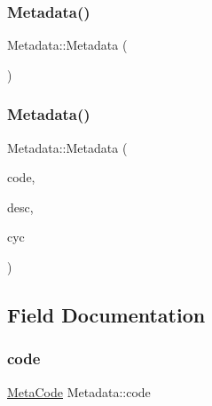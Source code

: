 \subsubsection{\texorpdfstring{Metadata()}{Metadata()}\hspace{0.1cm}{\footnotesize\ttfamily [1/2]}}
{\footnotesize\ttfamily Metadata\+::\+Metadata (\begin{DoxyParamCaption}{ }\end{DoxyParamCaption})\hspace{0.3cm}{\ttfamily [inline]}}

\hypertarget{struct_metadata_a5ff361e275630c284655d0e4d7e9667e}{}\label{struct_metadata_a5ff361e275630c284655d0e4d7e9667e} 
\subsubsection{\texorpdfstring{Metadata()}{Metadata()}\hspace{0.1cm}{\footnotesize\ttfamily [2/2]}}
{\footnotesize\ttfamily Metadata\+::\+Metadata (\begin{DoxyParamCaption}\item[{\hyperlink{_sim_data_structs_8h_af2e7854cb25f6e7ebcac71cd2dd88516}{Meta\+Code}}]{code,  }\item[{\hyperlink{_sim_data_structs_8h_abb2b49b699fce2da44bb66f1b315b6d6}{Meta\+Desc}}]{desc,  }\item[{int}]{cyc }\end{DoxyParamCaption})\hspace{0.3cm}{\ttfamily [inline]}}



\subsection{Field Documentation}
\hypertarget{struct_metadata_aaaa34653675e35de31549f6dd8eeec3c}{}\label{struct_metadata_aaaa34653675e35de31549f6dd8eeec3c} 
\subsubsection{\texorpdfstring{code}{code}}
{\footnotesize\ttfamily \hyperlink{_sim_data_structs_8h_af2e7854cb25f6e7ebcac71cd2dd88516}{Meta\+Code} Metadata\+::code}

\hypertarget{struct_metadata_a08201dc6b46eb3d7adca3b1193d28edc}{}\label{struct_metadata_a08201dc6b46eb3d7adca3b1193d28edc} 
